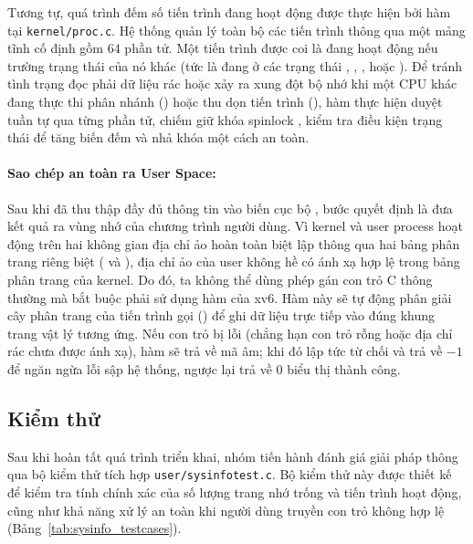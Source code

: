 Tương tự, quá trình đếm số tiến trình đang hoạt động được thực hiện bởi hàm
 tại \texttt{kernel/proc.c}. Hệ thống quản lý toàn bộ các tiến
trình thông qua một mảng tĩnh cố định  gồm $64$ phần tử. Một
tiến trình được coi là đang hoạt động nếu trường trạng thái của nó khác 
(tức là đang ở các trạng thái , , ,
 hoặc ). Để tránh tình trạng đọc phải dữ liệu rác hoặc
xảy ra xung đột bộ nhớ khi một CPU khác đang thực thi phân nhánh () hoặc
thu dọn tiến trình (), hàm thực hiện duyệt tuần tự qua từng phần tử,
chiếm giữ khóa spinlock , kiểm tra điều kiện trạng thái để
tăng biến đếm và nhả khóa  một cách an toàn.

\paragraph*{Sao chép an toàn ra User Space:} Sau khi đã thu thập đầy đủ thông tin
vào biến cục bộ , bước quyết định là đưa kết quả ra
vùng nhớ của chương trình người dùng. Vì kernel và user process hoạt động trên hai
không gian địa chỉ ảo hoàn toàn biệt lập thông qua hai bảng phân trang riêng biệt
( và ), địa chỉ ảo  của
user không hề có ánh xạ hợp lệ trong bảng phân trang của kernel. Do đó, ta không thể
dùng phép gán con trỏ C thông thường mà bắt buộc phải sử dụng hàm 
của xv6. Hàm này sẽ tự động phân giải cây phân trang của tiến trình gọi ()
để ghi dữ liệu trực tiếp vào đúng khung trang vật lý tương ứng. Nếu con trỏ 
bị lỗi (chẳng hạn con trỏ rỗng hoặc địa chỉ rác chưa được ánh xạ), hàm 
sẽ trả về mã âm; khi đó  lập tức từ chối và trả về $-1$ để ngăn
ngừa lỗi sập hệ thống, ngược lại trả về $0$ biểu thị thành công.

\subsection{Kiểm thử}
Sau khi hoàn tất quá trình triển khai, nhóm tiến hành đánh giá giải pháp thông qua
bộ kiểm thử tích hợp \texttt{user/sysinfotest.c}. Bộ kiểm thử này được thiết kế
để kiểm tra tính chính xác của số lượng trang nhớ trống và tiến trình hoạt động,
cũng như khả năng xử lý an toàn khi người dùng truyền con trỏ không hợp lệ
(Bảng~\ref{tab:sysinfo_testcases}).

